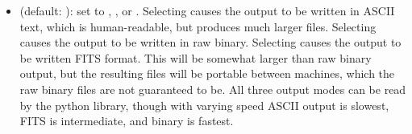 \documentclass[letterpaper,10pt,english]{sphinxmanual}
\begin{document}
\begin{itemize}
\item {} 
 (default: ): set to , , or . Selecting  causes the output to be written in ASCII text, which is human-readable, but produces much larger files. Selecting  causes the output to be written in raw binary. Selecting  causes the output to be written FITS format. This will be somewhat larger than raw binary output, but the resulting files will be portable between machines, which the raw binary files are not guaranteed to be. All three output modes can be read by the python library, though with varying speed \textendash{} ASCII output is slowest, FITS is intermediate, and binary is fastest.

\end{itemize}
\end{document}
